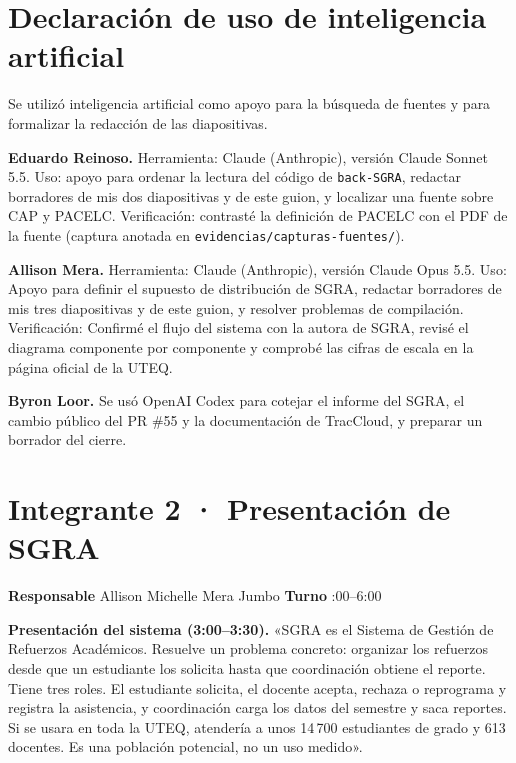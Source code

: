 \documentclass[10pt,a4paper]{article}
\begin{document}
\section*{Declaración de uso de inteligencia artificial}

Se utilizó inteligencia artificial como apoyo para la búsqueda de fuentes y
para formalizar la redacción de las diapositivas.

\textbf{Eduardo Reinoso.} Herramienta: Claude (Anthropic), versión Claude Sonnet 5.5. Uso: apoyo para ordenar la lectura del código de \texttt{back-SGRA}, redactar borradores de mis dos diapositivas y de este guion, y localizar una fuente sobre CAP y PACELC. Verificación: contrasté la definición de PACELC con el PDF de la fuente (captura anotada en \texttt{evidencias/capturas-fuentes/}).

\textbf{Allison Mera.} Herramienta: Claude (Anthropic), versión Claude Opus 5.5. Uso: Apoyo para definir el supuesto de distribución de SGRA, redactar borradores de mis tres diapositivas y de este guion, y resolver problemas de compilación. Verificación: Confirmé el flujo del sistema con la autora de SGRA, revisé el diagrama componente por componente y comprobé las cifras de escala en la página oficial de la UTEQ.

\textbf{Byron Loor.} Se usó OpenAI Codex para cotejar el informe del SGRA, el cambio público del PR \#55 y la documentación de TracCloud, y preparar un borrador del cierre.
\section*{Integrante 2 · Presentación de SGRA}

\textbf{Responsable} \quad Allison Michelle Mera Jumbo \hfill \textbf{Turno} :00--6:00

\textbf{Presentación del sistema (3:00--3:30).}
«SGRA es el Sistema de Gestión de Refuerzos Académicos. Resuelve un problema concreto: organizar los refuerzos desde que un estudiante los solicita hasta que coordinación obtiene el reporte. Tiene tres roles. El estudiante solicita, el docente acepta, rechaza o reprograma y registra la asistencia, y coordinación carga los datos del semestre y saca reportes. Si se usara en toda la UTEQ, atendería a unos 14\,700 estudiantes de grado y 613 docentes. Es una población potencial, no un uso medido».
\cite{back,uteqcifras}
\end{document}
